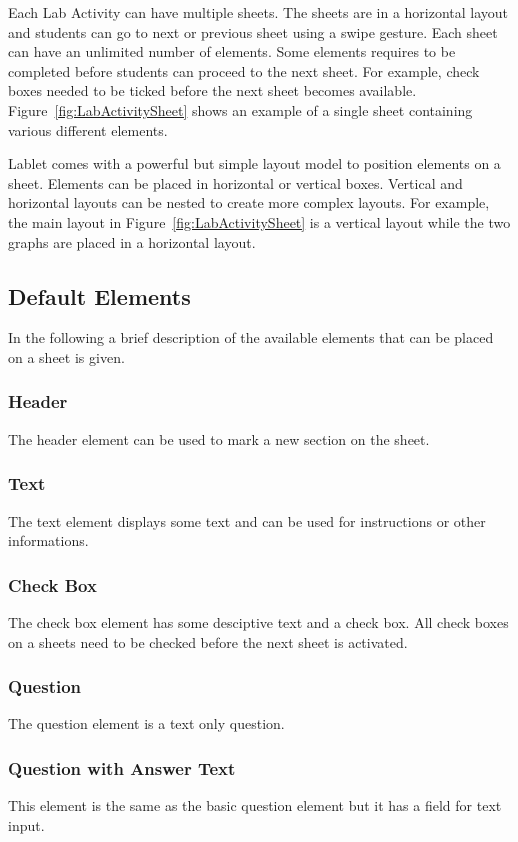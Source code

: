 \documentclass{sigchi}
\begin{document}
Each Lab Activity can have multiple sheets.  The sheets are in a
horizontal layout and students can go to next or previous sheet using
a swipe gesture.  Each sheet can have an unlimited number of elements.
Some elements requires to be completed before students can proceed to
the next sheet.  For example, check boxes needed to be ticked before
the next sheet becomes available.  Figure~\ref{fig:LabActivitySheet}
shows an example of a single sheet containing various different
elements.

Lablet comes with a powerful but simple layout model to position
elements on a sheet.  Elements can be placed in horizontal or vertical
boxes.  Vertical and horizontal layouts can be nested to create more
complex layouts.  For example, the main layout in
Figure~\ref{fig:LabActivitySheet} is a vertical layout while the two
graphs are placed in a horizontal layout.

\subsection{Default Elements}
In the following a brief description of the available elements that
can be placed on a sheet is given.

\subsubsection*{Header}
The header element can be used to mark a new section on the sheet.

\subsubsection*{Text}
The text element displays some text and can be used for instructions
or other informations.

\subsubsection*{Check Box}
The check box element has some desciptive text and a check box.  All
check boxes on a sheets need to be checked before the next sheet is
activated.

\subsubsection*{Question}
The question element is a text only question.

\subsubsection*{Question with Answer Text}
This element is the same as the basic question element but it has a
field for text input.
\end{document}
